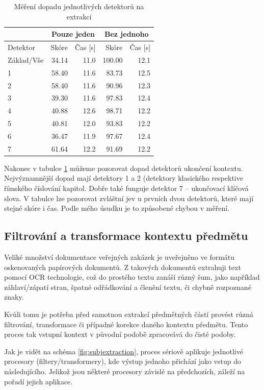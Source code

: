 \documentclass[thesis=M,czech]{FITthesis}[2019/12/23]
\begin{document}
\begin{table}[h!]
\centering
\begin{tabular}{ |l|r|r|r|r| }
\hline
 & \multicolumn{2}{|c|}{Pouze jeden} & \multicolumn{2}{|c|}{Bez jednoho} \\\hline
Detektor & Skóre & Čas [s] & Skóre & Čas [s] \\\hline
\hline
Základ/Vše & 34.14 & 11.0 & 100.00 & 12.1\\\hline
1 & 58.40 & 11.6 & 83.73 & 12.5\\
2 & 58.40 & 11.6 & 90.96 & 12.3\\
3 & 39.30 & 11.6 & 97.83 & 12.4\\
4 & 40.88 & 12.6 & 98.71 & 12.2\\\hline
5 & 40.81 & 12.0 & 93.83 & 12.2\\
6 & 36.47 & 11.9 & 97.67 & 12.4\\
7 & 61.64 & 12.2 & 91.69 & 12.2\\\hline
\end{tabular}
\caption{Měření dopadu jednotlivých detektorů na extrakci}
\label{table:experiment_detectors}
\end{table}

Nakonec v tabulce \ref{table:experiment_detectors} můžeme pozorovat dopad detektorů ukončení kontextu. Nejvýznamnější dopad mají detektory 1 a 2 (detektory klasického respektive římského číslování kapitol. Dobře také funguje detektor 7 -- ukončovací klíčová slova. V tabulce lze pozorovat zvláštní jev u prvních dvou detektorů, které mají stejné skóre i čas. Podle mého úsudku je to způsobené chybou v měření.


\subsection{Filtrování a transformace kontextu předmětu}
\label{sec:subj_filtering}

Veliké množství dokumentace veřejných zakázek je uveřejněno ve formátu oskenovaných papírových dokumentů. Z takových dokumentů extrahuji text pomocí OCR technologie, což do prostého textu zanáší různý šum, jako například záhlaví/zápatí stran, špatné odřádkování a členění textu, či chybně rozpoznané znaky.

Kvůli tomu je potřeba před samotnou extrakcí předmětných částí provést různá filtrování, transformace či případné korekce daného kontextu předmětu. Tento proces tak vstupní kontext v původní podobě zpracovává do čisté podoby.

Jak je vidět na schéma \ref{fig:subjextraction}, proces sériově aplikuje jednotlivé procesory (filtery/transformery), kde výstup jednoho přichází jako vstup do následujícího. Jelikož jsou některé procesory závislé na předchozích, záleží na pořadí jejich aplikace.
\end{document}
